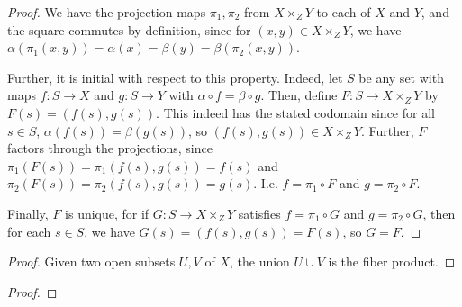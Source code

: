 \documentclass[12pt]{exam}
\begin{document}
\begin{proof}
	We have the projection maps $\pi_1,\pi_2$ from $X \times_Z Y$ to each of $X$ and $Y$, and the square commutes by definition, since for $(x,y) \in X \times_Z Y$, we have $\alpha(\pi_1(x,y)) = \alpha(x) = \beta(y) = \beta(\pi_2(x,y))$.
	
	Further, it is initial with respect to this property. Indeed, let $S$ be any set with maps $f : S \to X$ and $g : S \to Y$ with $\alpha \circ f = \beta \circ g$. Then, define $F : S \to X \times_Z Y$ by $F(s) = (f(s),g(s))$. This indeed has the stated codomain since for all $s \in S$, $\alpha(f(s)) = \beta(g(s))$, so $(f(s),g(s)) \in X \times_Z Y$. Further, $F$ factors through the projections, since $\pi_1(F(s)) = \pi_1(f(s),g(s)) = f(s)$ and $\pi_2(F(s)) = \pi_2(f(s),g(s)) = g(s)$. I.e. $f = \pi_1 \circ F$ and $g = \pi_2 \circ F$.
	
	Finally, $F$ is unique, for if $G : S \to X \times_Z Y$ satisfies $f = \pi_1 \circ G$ and $g = \pi_2 \circ G$, then for each $s \in S$, we have $G(s) = (f(s),g(s)) = F(s)$, so $G = F$.
\end{proof}

\begin{proof}
	Given two open subsets $U,V$ of $X$, the union $U \cup V$ is the fiber product.
\end{proof}

\begin{proof}
\end{proof}
\end{document}
